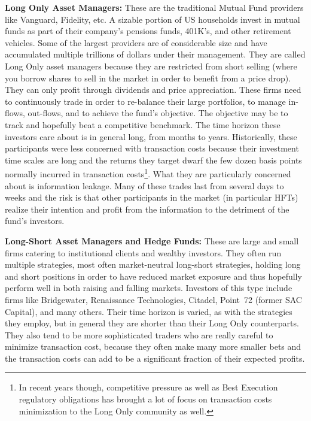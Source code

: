 \noindent\textbf{Long Only Asset Managers:} These are the traditional Mutual Fund providers like Vanguard, Fidelity, etc. A sizable portion of US households invest in mutual funds as part of their company's pensions funds, 401K's, and other retirement vehicles. Some of the largest providers are of considerable size and have accumulated multiple trillions of dollars under their management. They are called Long Only asset managers because they are restricted from short selling (where you borrow shares to sell in the market in order to benefit from a price drop). They can only profit through dividends and price appreciation. These firms need to continuously trade in order to re-balance their large portfolios, to manage in-flows, out-flows, and to achieve the fund's objective. The objective may be to track and hopefully beat a competitive benchmark. The time horizon these investors care about is in general long, from months to years. Historically, these participants were less concerned with transaction costs because their investment time scales are long and the returns they target dwarf the few dozen basis points normally incurred in transaction costs\footnote{In recent years though, competitive pressure as well as Best Execution regulatory obligations has brought a lot of focus on transaction costs minimization to the Long Only community as well.}. What they are particularly concerned about is information leakage. Many of these trades last from several days to weeks and the risk is that other participants in the market (in particular HFTs) realize their intention and profit from the information to the detriment of the fund's investors. \twomedskip


\noindent\textbf{Long-Short Asset Managers and Hedge Funds:} These are large and small firms catering to institutional clients and wealthy investors. They often run multiple strategies, most often market-neutral long-short strategies, holding long and short positions in order to have reduced market exposure and  thus hopefully perform well in both raising and falling markets. Investors of this type include firms like Bridgewater, Renaissance Technologies, Citadel, Point~72 (former SAC Capital), and many others. Their time horizon is varied, as with the strategies they employ, but in general they are shorter than their Long Only counterparts. They also tend to be more sophisticated traders who are really careful to minimize transaction cost, because they often make many more smaller bets and the transaction costs can add to be a significant fraction of their expected profits. \twomedskip


